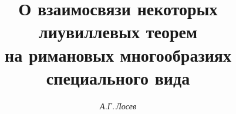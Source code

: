 

 




 


\newcommand{\sh}{\operatorname{sh}} 


\newcommand{\const}{\operatorname{const}} 


\renewcommand{\baselinestretch}{1.05}


 




 


\setcounter{page}{59} 












\author{\it А.Г.\,Лосев} 


\title {О взаимосвязи некоторых лиувиллевых теорем\\


на римановых многообразиях специального вида} 


 


\date{} 




 


\pagestyle{plain} %


 


 





